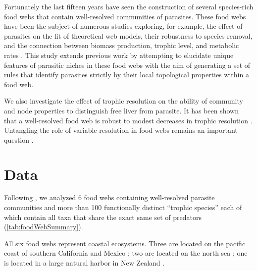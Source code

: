 \documentclass[../dissertation.tex]{subfiles}
\begin{document}
Fortunately the last fifteen years have seen the construction of several
species-rich food webs that contain well-resolved communities of parasites.
These food webs have been the subject of numerous studies exploring, for
example, the effect of parasites on the fit of theoretical web models, their
robustness to species removal, and the connection between biomass production,
trophic level, and metabolic rates \cite{Dunne2013, Lafferty2012,
Hechinger2011b}. This study extends previous work by attempting to elucidate
unique features of parasitic niches in these food webs with the aim of
generating a set of rules that identify parasites strictly by their local
topological properties within a food web.

We also investigate the effect of trophic resolution on the ability of
community and node properties to distinguish free liver from parasite. It has
been shown that a well-resolved food web is robust to modest decreases in
trophic resolution \cite{Martinez1991}. Untangling the role of variable 
resolution in food webs remains an important question \cite{Martinez1999}.

\section{Data} 
Following \cite{Dunne2013}, we analyzed 6 food webs containing well-resolved
parasite communities and more than 100 functionally distinct ``trophic
species'' each of which contain all taxa that share the exact same set of
predators (\ref{tab:foodWebSummary}).


All six food webs represent coastal ecosystems. Three are located on the pacific
coast of southern California and Mexico \cite{Hechinger2011a}; two are located
on the north sea \cite{Thieltges2011,Zander2011}; one is located in a large
natural harbor in New Zealand \cite{Mouritsen2011}. 
\end{document}
